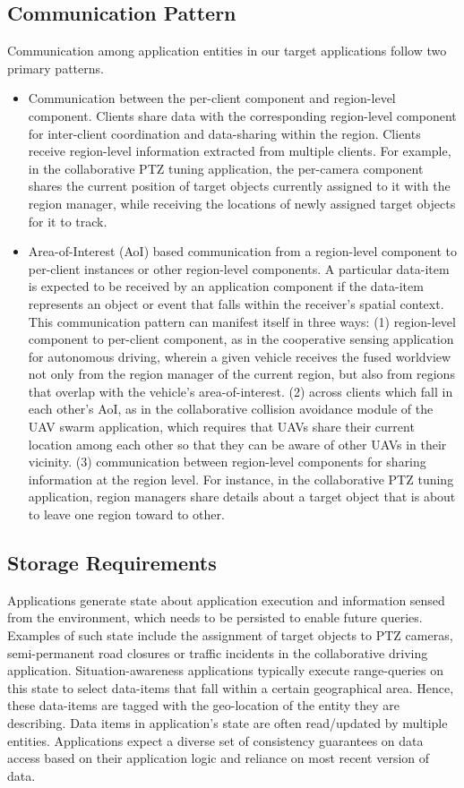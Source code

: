 \subsection{Communication Pattern}
\label{sec:app_model_comm}
Communication among application entities in our target applications follow two primary patterns.
\begin{itemize}
\item Communication between the per-client component and region-level component. Clients share data with the corresponding region-level component for inter-client coordination and data-sharing within the region. Clients receive region-level information extracted from multiple clients. For example, in the collaborative PTZ tuning application, the per-camera component shares the current position of target objects currently assigned to it with the region manager, while receiving the locations of newly assigned target objects for it to track.
\item Area-of-Interest (AoI) based communication from a region-level component to per-client instances or other region-level components. A particular data-item is expected to be received by an application component if the data-item represents an object or event that falls within the receiver's spatial context. This communication pattern can manifest itself in three ways: (1) region-level component to per-client component, as in the cooperative sensing application for autonomous driving, wherein a given vehicle receives the fused worldview not only from the region manager of the current region, but also from regions that overlap with the vehicle's area-of-interest. (2) across clients which fall in each other's AoI, as in the collaborative collision avoidance module of the UAV swarm application, which requires that UAVs share their current location among each other so that they can be aware of other UAVs in their vicinity. (3) communication between region-level components for sharing information at the region level. For instance, in the collaborative PTZ tuning application, region managers share details about a target object that is about to leave one region toward to other.
\end{itemize}
\subsection{Storage Requirements}
Applications generate state about application execution and information sensed from the environment, which needs to be persisted to enable future queries. Examples of such state include the assignment of target objects to PTZ cameras, semi-permanent road closures or traffic incidents in the collaborative driving application. Situation-awareness applications typically execute range-queries on this state to select data-items that fall within a certain geographical area. Hence, these data-items are tagged with the geo-location of the entity they are describing. Data items in application's state are often read/updated by multiple entities. Applications expect a diverse set of  consistency guarantees on data access based on their application logic and reliance on most recent version of data.

